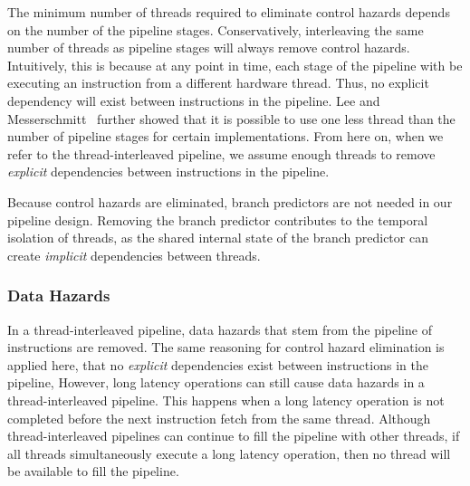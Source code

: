 The minimum number of threads required to eliminate control hazards depends on the number of the pipeline stages.
Conservatively, interleaving the same number of threads as pipeline stages will always remove control hazards.
Intuitively, this is because at any point in time, each stage of the pipeline with be executing an instruction from a different hardware thread. 
Thus, no explicit dependency will exist between instructions in the pipeline. 
Lee and Messerschmitt~\cite{lee1987pip} further showed that it is possible to use one less thread than the number of pipeline stages for certain implementations. 
From here on, when we refer to the thread-interleaved pipeline, we assume enough threads to remove \emph{explicit} dependencies between instructions in the pipeline.

Because control hazards are eliminated, branch predictors are not needed in our pipeline design. 
Removing the branch predictor contributes to the temporal isolation of threads, as the shared internal state of the branch predictor can create \emph{implicit} dependencies between threads.  

\subsubsection{Data Hazards}
In a thread-interleaved pipeline, data hazards that stem from the pipeline of instructions are removed.  
The same reasoning for control hazard elimination is applied here, that no \emph{explicit} dependencies exist between instructions in the pipeline, 
However, long latency operations can still cause data hazards in a thread-interleaved pipeline. 
This happens when a long latency operation is not completed before the next instruction fetch from the same thread.
Although thread-interleaved pipelines can continue to fill the pipeline with other threads, if all threads simultaneously execute a long latency operation, then no thread will be available to fill the pipeline. 

